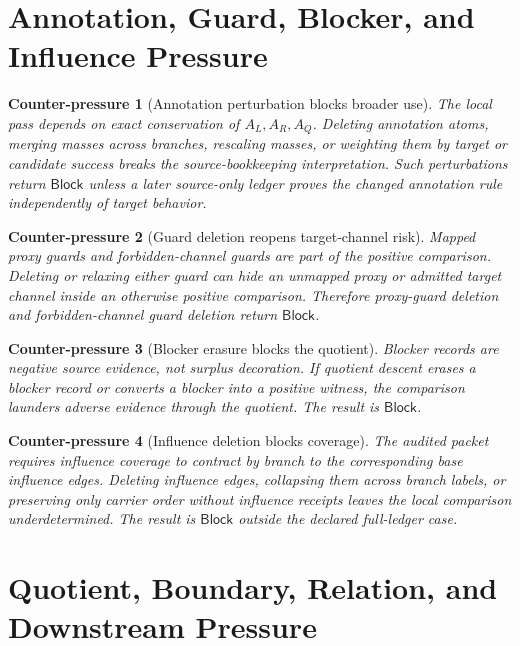 \documentclass[11pt]{article}
\newcommand{\Block}{\mathsf{Block}}
\newtheorem{counterpressure}{Counter-pressure}
\begin{document}
\section{Annotation, Guard, Blocker, and Influence Pressure}

\begin{counterpressure}[Annotation perturbation blocks broader use]
The local pass depends on exact conservation of \(A_{L},A_{R},A_{Q}\).
Deleting annotation atoms, merging masses across branches, rescaling
masses, or weighting them by target or candidate success breaks the
source-bookkeeping interpretation. Such perturbations return
\(\Block\) unless a later source-only ledger proves the changed
annotation rule independently of target behavior.
\end{counterpressure}

\begin{counterpressure}[Guard deletion reopens target-channel risk]
Mapped proxy guards and forbidden-channel guards are part of the
positive comparison. Deleting or relaxing either guard can hide an
unmapped proxy or admitted target channel inside an otherwise positive
comparison. Therefore proxy-guard deletion and forbidden-channel guard
deletion return \(\Block\).
\end{counterpressure}

\begin{counterpressure}[Blocker erasure blocks the quotient]
Blocker records are negative source evidence, not surplus decoration.
If quotient descent erases a blocker record or converts a blocker into a
positive witness, the comparison launders adverse evidence through the
quotient. The result is \(\Block\).
\end{counterpressure}

\begin{counterpressure}[Influence deletion blocks coverage]
The audited packet requires influence coverage to contract by branch to
the corresponding base influence edges. Deleting influence edges,
collapsing them across branch labels, or preserving only carrier order
without influence receipts leaves the local comparison underdetermined.
The result is \(\Block\) outside the declared full-ledger case.
\end{counterpressure}

\section{Quotient, Boundary, Relation, and Downstream Pressure}
\end{document}
